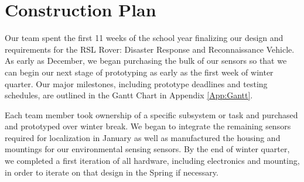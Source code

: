 \chapter{Construction Plan}

Our team spent the first 11 weeks of the school year finalizing our design and requirements for the RSL Rover: Disaster Response and Reconnaissance Vehicle. As early as December, we began purchasing the bulk of our sensors so that we can begin our next stage of prototyping as early as the first week of winter quarter. Our major milestones, including prototype deadlines and testing schedules, are outlined in the Gantt Chart in Appendix \ref{App:Gantt}. 

Each team member took ownership of a specific subsystem or task and purchased and prototyped over winter break. We began to  integrate the remaining sensors required for localization in January as well as manufactured the housing and mountings for our environmental sensing sensors. By the end of winter quarter, we completed a first iteration of all hardware, including electronics and mounting, in order to iterate on that design in the Spring if necessary. 


